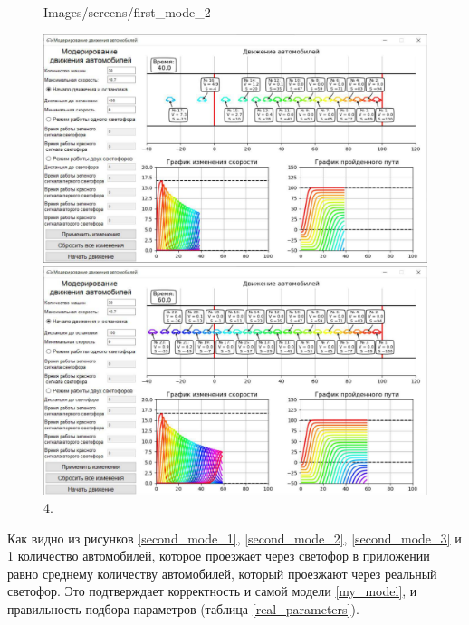 \documentclass[12pt, a4paper]{extarticle}
\numberwithin{equation}{section}
\numberwithin{figure}{section}
\begin{document}
\begin{figure}[h!]
\begin{center}
\begin{minipage}[h]{0.48\linewidth}
			{Images/screens/first_mode_2}
			\caption{2.}
			\label{second_mode_2}
		\end{minipage}
		\hfill 
		\begin{minipage}[h]{0.48\linewidth}
			\includegraphics[width=1\linewidth]
			{Images/screens/first_mode_3}
			\caption{3.}
			\label{second_mode_3}
		\end{minipage}
		\hfill 
		\begin{minipage}[h]{0.48\linewidth}
			\includegraphics[width=1\linewidth]
			{Images/screens/first_mode_4}
			\caption{4.}
			\label{second_mode_4}
		\end{minipage}
	\end{center}
\end{figure}

Как видно из рисунков \ref{second_mode_1}, \ref{second_mode_2}, \ref{second_mode_3} и \ref{second_mode_4} количество автомобилей, которое проезжает через светофор в приложении равно среднему количеству автомобилей, который проезжают через реальный светофор. Это подтверждает корректность и самой модели \eqref{my_model}, и правильность подбора параметров (таблица \ref{real_parameters}). 
\end{document}
